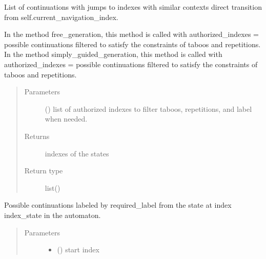 \documentclass[letterpaper,10pt,english]{sphinxmanual}
\begin{document}
\begin{fulllineitems}
\begin{fulllineitems}
\end{fulllineitems}


\begin{fulllineitems}
\label{\detokenize{index:Model.FactorOracle.continuations_with_jump}}
List of continuations with jumps to indexes with similar contexts direct transition from self.current\_navigation\_index.

In the method free\_generation, this method is called with authorized\_indexes = possible continuations filtered to satisfy the constraints of taboos and repetitions.
In the method simply\_guided\_generation, this method is called with authorized\_indexes = possible continuations  filtered to satisfy the constraints of taboos and repetitions.
\begin{quote}\begin{description}
\item[{Parameters}] \leavevmode
{} (\sphinxstyleliteralemphasis{(}\sphinxstyleliteralemphasis{)}) \textendash{} list of authorized indexes to filter taboos, repetitions, and label when needed.

\item[{Returns}] \leavevmode
indexes of the states

\item[{Return type}] \leavevmode
list()

\end{description}\end{quote}

\end{fulllineitems}


\begin{fulllineitems}
\label{\detokenize{index:Model.FactorOracle.continuations_with_label}}
Possible continuations labeled by required\_label from the state at index index\_state in the automaton.
\begin{quote}\begin{description}
\item[{Parameters}] \leavevmode\begin{itemize}
\item {} 
 () \textendash{} start index


\end{itemize}
\end{description}
\end{quote}
\end{fulllineitems}
\end{fulllineitems}
\end{document}
